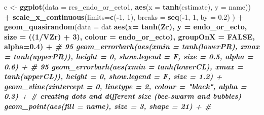 \documentclass[
]{article}
\newenvironment{Shaded}{\begin{snugshade}}{\end{snugshade}}
\newcommand{\CommentTok}[1]{\textcolor[rgb]{0.56,0.35,0.01}{\textit{#1}}}
\newcommand{\DataTypeTok}[1]{\textcolor[rgb]{0.13,0.29,0.53}{#1}}
\newcommand{\DecValTok}[1]{\textcolor[rgb]{0.00,0.00,0.81}{#1}}
\newcommand{\FloatTok}[1]{\textcolor[rgb]{0.00,0.00,0.81}{#1}}
\newcommand{\KeywordTok}[1]{\textcolor[rgb]{0.13,0.29,0.53}{\textbf{#1}}}
\newcommand{\NormalTok}[1]{#1}
\newcommand{\OperatorTok}[1]{\textcolor[rgb]{0.81,0.36,0.00}{\textbf{#1}}}
\newcommand{\OtherTok}[1]{\textcolor[rgb]{0.56,0.35,0.01}{#1}}
\newcommand{\StringTok}[1]{\textcolor[rgb]{0.31,0.60,0.02}{#1}}
\begin{document}
\begin{Shaded}
\begin{Highlighting}[]
\NormalTok{e <-}\StringTok{ }\KeywordTok{ggplot}\NormalTok{(}\DataTypeTok{data =}\NormalTok{ res_endo_or_ecto1, }\KeywordTok{aes}\NormalTok{(}\DataTypeTok{x =} \KeywordTok{tanh}\NormalTok{(estimate), }\DataTypeTok{y =}\NormalTok{ name)) }\OperatorTok{+}
\StringTok{  }\KeywordTok{scale_x_continuous}\NormalTok{(}\DataTypeTok{limits=}\KeywordTok{c}\NormalTok{(}\OperatorTok{-}\DecValTok{1}\NormalTok{, }\DecValTok{1}\NormalTok{), }\DataTypeTok{breaks =} \KeywordTok{seq}\NormalTok{(}\OperatorTok{-}\DecValTok{1}\NormalTok{, }\DecValTok{1}\NormalTok{, }\DataTypeTok{by =} \FloatTok{0.2}\NormalTok{) ) }\OperatorTok{+}
\StringTok{  }\KeywordTok{geom_quasirandom}\NormalTok{(}\DataTypeTok{data =}\NormalTok{ dat }\OperatorTok{%
                   \KeywordTok{aes}\NormalTok{(}\DataTypeTok{x=} \KeywordTok{tanh}\NormalTok{(Zr), }\DataTypeTok{y =}\NormalTok{ endo_or_ecto, }\DataTypeTok{size =}\NormalTok{ ((}\DecValTok{1}\OperatorTok{/}\NormalTok{VZr) }\OperatorTok{+}\StringTok{ }\DecValTok{3}\NormalTok{), }\DataTypeTok{colour =}\NormalTok{ endo_or_ecto), }\DataTypeTok{groupOnX =} \OtherTok{FALSE}\NormalTok{, }\DataTypeTok{alpha=}\FloatTok{0.4}\NormalTok{) }\OperatorTok{+}\StringTok{ }
\StringTok{  }\CommentTok{# 95 %
\StringTok{  }\KeywordTok{geom_errorbarh}\NormalTok{(}\KeywordTok{aes}\NormalTok{(}\DataTypeTok{xmin =} \KeywordTok{tanh}\NormalTok{(lowerPR), }\DataTypeTok{xmax =} \KeywordTok{tanh}\NormalTok{(upperPR)),  }\DataTypeTok{height =} \DecValTok{0}\NormalTok{, }\DataTypeTok{show.legend =}\NormalTok{ F, }\DataTypeTok{size =} \FloatTok{0.5}\NormalTok{, }\DataTypeTok{alpha =} \FloatTok{0.6}\NormalTok{) }\OperatorTok{+}
\StringTok{  }\CommentTok{# 95 %
\StringTok{  }\KeywordTok{geom_errorbarh}\NormalTok{(}\KeywordTok{aes}\NormalTok{(}\DataTypeTok{xmin =} \KeywordTok{tanh}\NormalTok{(lowerCL), }\DataTypeTok{xmax =} \KeywordTok{tanh}\NormalTok{(upperCL)),  }\DataTypeTok{height =} \DecValTok{0}\NormalTok{, }\DataTypeTok{show.legend =}\NormalTok{ F, }\DataTypeTok{size =} \FloatTok{1.2}\NormalTok{) }\OperatorTok{+}
\StringTok{  }\KeywordTok{geom_vline}\NormalTok{(}\DataTypeTok{xintercept =} \DecValTok{0}\NormalTok{, }\DataTypeTok{linetype =} \DecValTok{2}\NormalTok{, }\DataTypeTok{colour =} \StringTok{"black"}\NormalTok{, }\DataTypeTok{alpha =} \FloatTok{0.3}\NormalTok{) }\OperatorTok{+}
\StringTok{  }\CommentTok{# creating dots and different size (bee-swarm and bubbles)}
\StringTok{  }\KeywordTok{geom_point}\NormalTok{(}\KeywordTok{aes}\NormalTok{(}\DataTypeTok{fill =}\NormalTok{ name), }\DataTypeTok{size =} \DecValTok{3}\NormalTok{, }\DataTypeTok{shape =} \DecValTok{21}\NormalTok{) }\OperatorTok{+}\StringTok{ }\CommentTok{#}
}}}
\end{Highlighting}
\end{Shaded}
\end{document}
